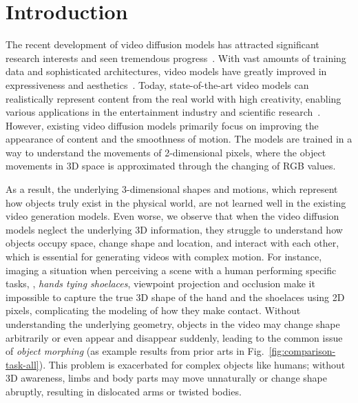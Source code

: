 \section{Introduction}
The recent development of video diffusion models has attracted significant research interests and seen tremendous progress~\cite{blattmann2023stablevideodiffusionscaling, singer2023makeavideo,ho2022imagenvideohighdefinition}. 
With vast amounts of training data and sophisticated architectures, video models have greatly improved in expressiveness and aesthetics~\cite{videoworldsimulators2024,genmo2024mochi}. Today, state-of-the-art video models can realistically represent content from the real world with high creativity, enabling various applications in the entertainment industry and scientific research~\cite{Menapace_2024_CVPR}. 
However, existing video diffusion models primarily focus on improving the appearance of content and the smoothness of motion. 
The models are trained in a way to understand the movements of 2-dimensional pixels, where the object movements in 3D space is approximated through the changing of RGB values.



As a result, the underlying 3-dimensional shapes and motions, which represent how objects truly exist in the physical world, are not learned well in the existing video generation models.
Even worse, we observe that when the video diffusion models neglect the underlying 3D information, they struggle to understand 
how objects occupy space, change shape and location, and interact with each other, which is essential for generating videos with complex motion.
For instance, imaging a situation when perceiving a scene with a human performing specific tasks, \eg, \textit{hands tying shoelaces}, viewpoint projection and occlusion make it impossible to capture the true 3D shape of the hand and the shoelaces using 2D pixels, complicating the modeling of how they make contact. 
Without understanding the underlying geometry, objects in the video may change shape arbitrarily or even appear and disappear suddenly, leading to the common issue of \textit{object morphing} (as example results from prior arts in Fig.~\ref{fig:comparison-task-all}). 
This problem is exacerbated for complex objects like humans; without 3D awareness, limbs and body parts may move unnaturally or change shape abruptly, resulting in dislocated arms or twisted bodies.

